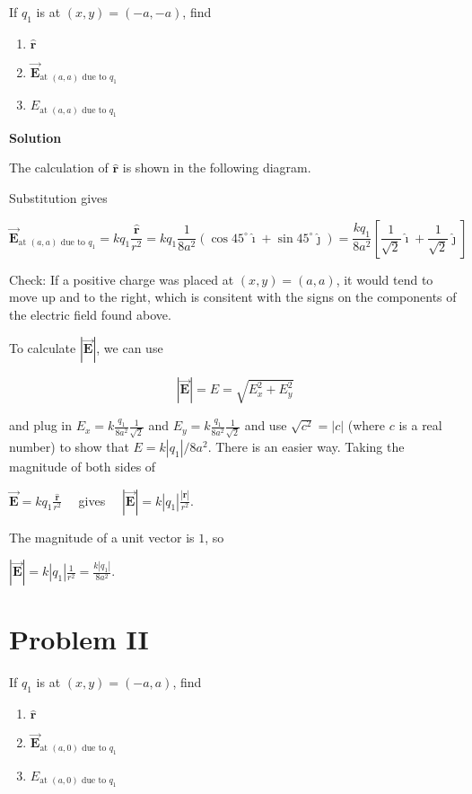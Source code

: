 \documentclass{article}
\newcommand{\ds}[0]{\displaystyle}
\newcommand{\ihat}[0]{\hat{\boldsymbol{\imath}}}
\newcommand{\jhat}[0]{\hat{\boldsymbol{\jmath}}}
\newcommand{\rhat}[0]{\hat{\mathbf{r}}}
\newcommand{\bfvec}[1]{\vec{\mathbf{#1}}}
\begin{document}
If $q_1$ is at $(x,y)=(-a,-a)$, find 

\begin{enumerate}

  \item $\rhat$

  \item $\bfvec{E}_{\text{at }(a,a)\text{ due to }q_1}$

  \item $E_{\text{at }(a,a)\text{ due to }q_1}$

\end{enumerate}

\textbf{Solution}

The calculation of $\rhat$ is shown in the following diagram.



Substitution gives

$$\bfvec{E}_{\text{at }(a,a)\text{ due to }q_1}=kq_1\frac{\rhat}{r^2} = kq_1\frac{1}{8a^2}(\cos 45^\circ \ihat + \sin 45^\circ \jhat) =\frac{kq_1}{8a^2}\left[\frac{1}{\sqrt{2}}\ihat + \frac{1}{\sqrt{2}}\jhat\right]$$

Check: If a positive charge was placed at $(x,y)=(a,a)$, it would tend to move up and to the right, which is consitent with the signs on the components of the electric field found above.

To calculate $|\bfvec{E}|$, we can use

$$|\bfvec{E}|=E=\sqrt{E_x^2+E_y^2}$$

and plug in $E_x=k\frac{q_1}{8a^2}\frac{1}{\sqrt{2}}$ and $E_y=k\frac{q_1}{8a^2}\frac{1}{\sqrt{2}}$ and use $\sqrt{c^2}=|c|$ (where $c$ is a real number) to show that $E=k|q_1|/{8a^2}$. There is an easier way. Taking the magnitude of both sides of

$\ds\bfvec{E}=kq_1\frac{\rhat}{r^2}\quad$
gives
$\quad\ds|\bfvec{E}|=k|q_1|\frac{|\rhat|}{r^2}$.

The magnitude of a unit vector is $1$, so

$\ds|\bfvec{E}|=k|q_1|\frac{1}{r^2}=\frac{k|q_1|}{8a^2}$.

\section{Problem II}

If $q_1$ is at $(x,y)=(-a,a)$, find 

\begin{enumerate}

  \item $\rhat$

  \item $\bfvec{E}_{\text{at }(a,0)\text{ due to }q_1}$

  \item $E_{\text{at }(a,0)\text{ due to }q_1}$

\end{enumerate}
\end{document}
